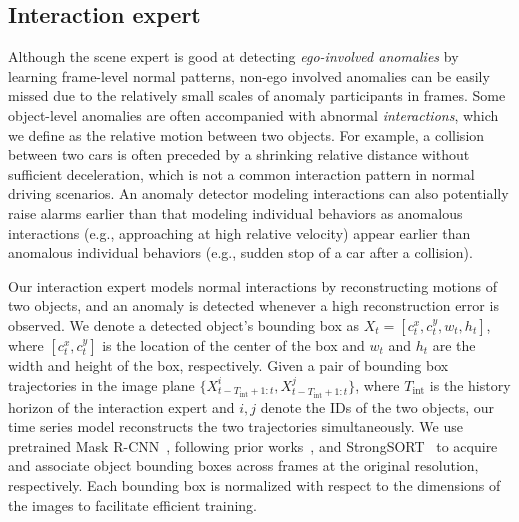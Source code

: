 \subsection{Interaction expert}
\label{subsec:im}
Although the scene expert is good at detecting \textit{ego-involved anomalies} by learning frame-level normal patterns, non-ego involved anomalies can be easily missed due to the relatively small scales of anomaly participants in frames. Some object-level anomalies are often accompanied with abnormal \textit{interactions}, which we define as the relative motion between two objects. For example, a collision between two cars is often preceded by a shrinking relative distance without sufficient deceleration, which is not a common interaction pattern in normal driving scenarios. An anomaly detector modeling interactions can also potentially raise alarms earlier than that modeling individual behaviors as anomalous interactions (e.g., approaching at high relative velocity) appear earlier than anomalous individual behaviors (e.g., sudden stop of a car after a collision).

Our interaction expert models normal interactions by reconstructing motions of two objects, and an anomaly is detected whenever a high reconstruction error is observed. We denote a detected object's bounding box as $X_t=[c_t^x, c_t^y, w_t, h_t]$, where $[c_t^x, c_t^y]$ is the location of the center of the box and $w_t$ and $h_t$ are the width and height of the box, respectively. Given a pair of bounding box trajectories in the image plane $\{X_{t - T_\text{int} + 1:t}^i, X_{t - T_\text{int} + 1:t}^j\}$, where $T_\text{int}$ is the history horizon of the interaction expert and $i,j$ denote the IDs of the two objects, our time series model reconstructs the two trajectories simultaneously. We use pretrained Mask R-CNN~\citep{he2017mask}, following prior works~\citep{yao2022dota,yao2020and,fang2022traffic}, and StrongSORT~\citep{du2023strongsort} to acquire and associate object bounding boxes across frames at the original resolution, respectively. Each bounding box is normalized with respect to the dimensions of the images to facilitate efficient training.

